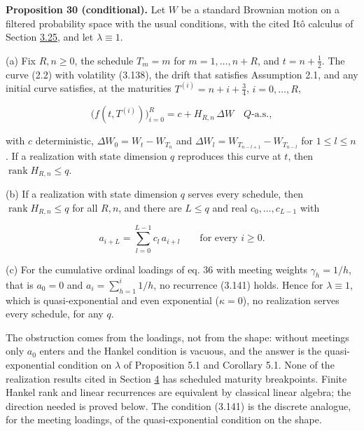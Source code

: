 \documentclass[11pt]{article}
\begin{document}
\label{res:Proposition-30}
\textbf{Proposition 30 (conditional).} Let \(W\) be a standard Brownian motion on a filtered probability space with the usual conditions, with the cited Itô calculus of Section \hyperref[sec:3.25]{3.25}, and let \(\lambda\equiv1\).

(a) Fix \(R,n\ge0\), the schedule \(T_m=m\) for \(m=1,\dots,n+R\), and \(t=n+\tfrac12\). The curve (2.2) with volatility (3.138), the drift that satisfies Assumption 2.1, and any initial curve satisfies, at the maturities \(T^{(i)}=n+i+\tfrac34\), \(i=0,\dots,R\),

\begin{equation*}
\bigl(f(t,T^{(i)})\bigr)_{i=0}^R=c+H_{R,n}\,\Delta W\quad Q\text{-a.s.}, \tag{3.140}\label{eq:3.140}
\end{equation*}

with \(c\) deterministic, \(\Delta W_0=W_t-W_{T_n}\) and \(\Delta W_l=W_{T_{n-l+1}}-W_{T_{n-l}}\) for \(1\le l\le n\). If a realization with state dimension \(q\) reproduces this curve at \(t\), then \(\operatorname{rank}H_{R,n}\le q\).

(b) If a realization with state dimension \(q\) serves every schedule, then \(\operatorname{rank}H_{R,n}\le q\) for all \(R,n\), and there are \(L\le q\) and real \(c_0,\dots,c_{L-1}\) with

\begin{equation*}
a_{i+L}=\sum_{l=0}^{L-1}c_l\,a_{i+l}\qquad\text{for every }i\ge0. \tag{3.141}\label{eq:3.141}
\end{equation*}

(c) For the cumulative ordinal loadings of \cite{brace2024sofr} eq. 36 with meeting weights \(\gamma_h=1/h\), that is \(a_0=0\) and \(a_i=\sum_{h=1}^i1/h\), no recurrence (3.141) holds. Hence for \(\lambda\equiv1\), which is quasi-exponential and even exponential (\(\kappa=0\)), no realization serves every schedule, for any \(q\).

The obstruction comes from the loadings, not from the shape: without meetings only \(a_0\) enters and the Hankel condition is vacuous, and the answer is the quasi-exponential condition on \(\lambda\) of \cite{bjork2001existence} Proposition 5.1 and Corollary 5.1. None of the realization results cited in Section \hyperref[sec:4]{4} has scheduled maturity breakpoints. Finite Hankel rank and linear recurrences are equivalent by classical linear algebra; the direction needed is proved below. The condition (3.141) is the discrete analogue, for the meeting loadings, of the quasi-exponential condition on the shape.
\end{document}

